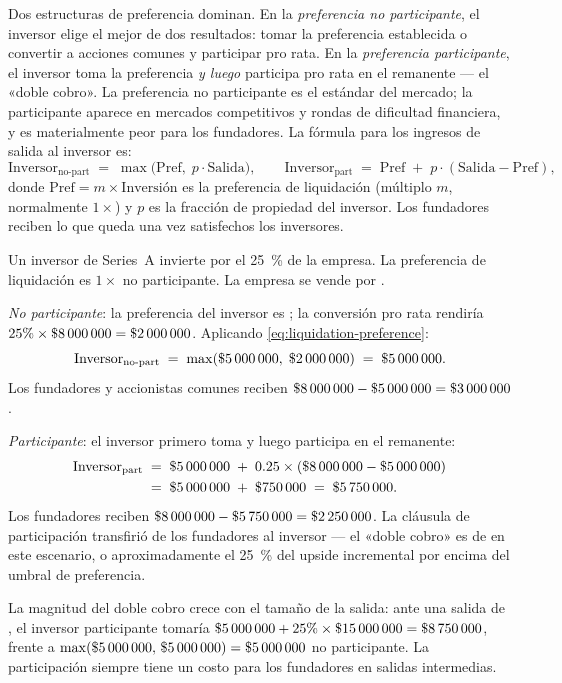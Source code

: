 Dos estructuras de preferencia dominan. En la \emph{preferencia no participante}, el
inversor elige el mejor de dos resultados: tomar la preferencia establecida o convertir a
acciones comunes y participar pro rata. En la \emph{preferencia participante}, el inversor
toma la preferencia \emph{y luego} participa pro rata en el remanente --- el «doble cobro».
La preferencia no participante es el estándar del mercado; la participante aparece en mercados
competitivos y rondas de dificultad financiera, y es materialmente peor para los fundadores.
La fórmula para los ingresos de salida al inversor es:
\begin{equation}\label{eq:liquidation-preference}
  \mathrm{Inversor}_{\text{no-part}}
  \;=\; \max\!\bigl(\mathrm{Pref},\; p \cdot \mathrm{Salida}\bigr),
  \qquad
  \mathrm{Inversor}_{\text{part}}
  \;=\; \mathrm{Pref} \;+\; p \cdot (\mathrm{Salida} - \mathrm{Pref}),
\end{equation}
donde \(\mathrm{Pref} = m \times \mathrm{Inversión}\) es la preferencia de liquidación
(múltiplo \(m\), normalmente \(1\times\)) y \(p\) es la fracción de propiedad del inversor.
Los fundadores reciben lo que queda una vez satisfechos los inversores.

\begin{example}
Un inversor de Series~A invierte  por el \qty{25}{\percent} de la empresa.
La preferencia de liquidación es \(1\times\) no participante. La empresa se vende por
.

\emph{No participante}: la preferencia del inversor es ; la conversión pro
rata rendiría \(25\% \times \$\num{8000000} = \$\num{2000000}\). Aplicando
\cref{eq:liquidation-preference}:
\[
  \mathrm{Inversor}_{\text{no-part}}
  \;=\; \max(\$\num{5000000},\;\$\num{2000000})
  \;=\; \$\num{5000000}.
\]
Los fundadores y accionistas comunes reciben \(\$\num{8000000} - \$\num{5000000} = \$\num{3000000}\).

\emph{Participante}: el inversor primero toma  y luego participa en el
remanente:
\[
  \begin{aligned}
    \mathrm{Inversor}_{\text{part}}
    &\;=\; \$\num{5000000} \;+\; 0.25 \times (\$\num{8000000} - \$\num{5000000}) \\
    &\;=\; \$\num{5000000} \;+\; \$\num{750000} \;=\; \$\num{5750000}.
  \end{aligned}
\]
Los fundadores reciben \(\$\num{8000000} - \$\num{5750000} = \$\num{2250000}\). La cláusula
de participación transfirió  de los fundadores al inversor --- el «doble cobro»
es de  en este escenario, o aproximadamente el \qty{25}{\percent} del upside
incremental por encima del umbral de preferencia.

La magnitud del doble cobro crece con el tamaño de la salida: ante una salida de
, el inversor participante tomaría \(\$\num{5000000} + 25\%\times\$\num{15000000} =
\$\num{8750000}\), frente a \(\max(\$\num{5000000},\,\$\num{5000000}) = \$\num{5000000}\)
no participante. La participación siempre tiene un costo para los fundadores en salidas
intermedias.
\end{example}

